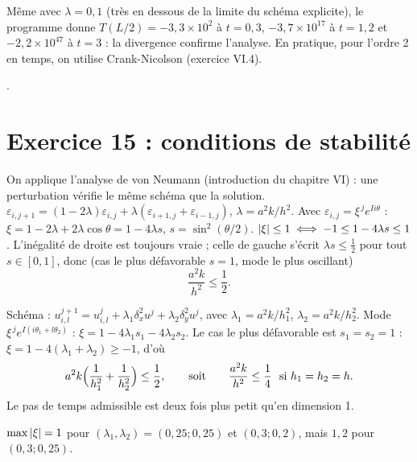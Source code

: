 
\Verif Même avec $\lambda = 0{,}1$ (très en dessous de la limite du schéma
explicite), le programme donne $T(L/2) = -3{,}3\times 10^{2}$ à $t = 0{,}3$,
$-3{,}7\times 10^{17}$ à $t = 1{,}2$ et $-2{,}2\times 10^{47}$ à $t = 3$ : la
divergence confirme l'analyse. En pratique, pour l'ordre 2 en temps, on utilise
Crank-Nicolson (exercice VI.4).

\Refs {}.

\section{Exercice 15 : conditions de stabilité}

\Pourquoi On applique l'analyse de von Neumann (introduction du chapitre VI) :
une perturbation vérifie le même schéma que la solution.
\Etapes
{} $\varepsilon_{i,j+1} = (1 - 2\lambda)\varepsilon_{i,j} + \lambda(\varepsilon_{i+1,j} + \varepsilon_{i-1,j})$,
$\lambda = a^2k/h^2$.
 Avec $\varepsilon_{i,j} = \xi^{\,j}e^{Ii\theta}$ :
$\xi = 1 - 2\lambda + 2\lambda\cos\theta = 1 - 4\lambda s$, $s = \sin^2(\theta/2)$.
 $\left|\xi\right| \le 1 \iff -1 \le 1 - 4\lambda s \le 1$. L'inégalité de
droite est toujours vraie ; celle de gauche s'écrit $\lambda s \le \frac12$ pour
tout $s \in [0,1]$, donc (cas le plus défavorable $s = 1$, mode le plus
oscillant)
\[
  \frac{a^2k}{h^2} \le \frac12 .
\]

 Schéma :
$u_{i,l}^{j+1} = u_{i,l}^{j} + \lambda_1\delta_x^2u^{j} + \lambda_2\delta_y^2u^{j}$, avec
$\lambda_1 = a^2k/h_1^2$, $\lambda_2 = a^2k/h_2^2$.
 Mode $\xi^{\,j}e^{I(i\theta_1 + l\theta_2)}$ :
$\xi = 1 - 4\lambda_1s_1 - 4\lambda_2s_2$.
 Le cas le plus défavorable est $s_1 = s_2 = 1$ :
$\xi = 1 - 4(\lambda_1 + \lambda_2) \ge -1$, d'où
\[
  a^2k\Bigl(\frac{1}{h_1^2} + \frac{1}{h_2^2}\Bigr) \le \frac12 ,
  \qquad\text{soit}\qquad \frac{a^2k}{h^2} \le \frac14 \ \text{ si } h_1 = h_2 = h .
\]
Le pas de temps admissible est deux fois plus petit qu'en dimension 1.

\Verif $\max\left|\xi\right| = 1$ pour $(\lambda_1, \lambda_2) = (0{,}25 ; 0{,}25)$ et
$(0{,}3 ; 0{,}2)$, mais $1{,}2$ pour $(0{,}3 ; 0{,}25)$.

